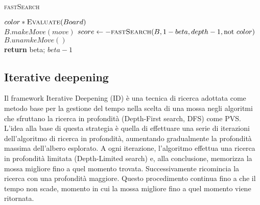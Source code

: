 \documentclass[a4paper]{article}
\begin{document}
\begin{algorithm}
  \caption{\textsc{fastSearch}}
  \label{alg_fastSeach}
  \begin{algorithmic}

        \State \Return $color * \Call{Evaluate}{Board}$
      \EndIf
      \\
        \State $B.makeMove(move)$
        \State $score \gets -\Call{fastSearch}{B, 1 - beta, depth - 1, \textrm{not } color}$
        \State $B.unamkeMove()$
        \\
        \State \textbf{return} beta;
        \EndIf
      \EndFor
      \State \Return $beta - 1$
    \EndFunction
  \end{algorithmic}
\end{algorithm}

\subsection{Iterative deepening}
Il framework Iterative Deepening (ID) è una tecnica di ricerca adottata come 
metodo base per la gestione del tempo nella scelta di una mossa negli algoritmi 
che sfruttano la ricerca in profondità (Depth-First search, DFS) come PVS. 
L'idea alla base di questa strategia è quella di effettuare una serie 
di iterazioni dell'algoritmo di ricerca in profondità, aumentando gradualmente 
la profondità massima dell'albero esplorato. A ogni iterazione, l'algoritmo 
effettua una ricerca in profondità limitata (Depth-Limited search) e, alla
conclusione, memorizza la mossa migliore fino a quel momento trovata. 
Successivamente ricomincia la ricerca con una profondità maggiore. Questo 
procedimento continua fino a che il tempo non scade, momento in cui la mossa 
migliore fino a quel momento viene ritornata.
\end{document}
